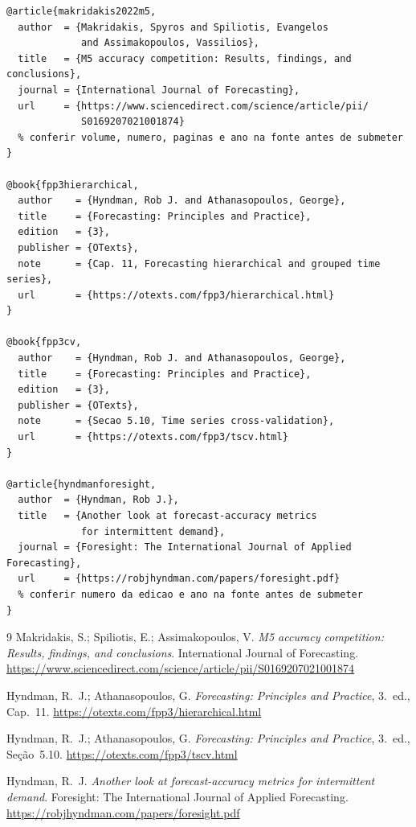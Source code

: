 \documentclass[11pt]{article}
\begin{document}
\begin{verbatim}
@article{makridakis2022m5,
  author  = {Makridakis, Spyros and Spiliotis, Evangelos
             and Assimakopoulos, Vassilios},
  title   = {M5 accuracy competition: Results, findings, and conclusions},
  journal = {International Journal of Forecasting},
  url     = {https://www.sciencedirect.com/science/article/pii/
             S0169207021001874}
  % conferir volume, numero, paginas e ano na fonte antes de submeter
}

@book{fpp3hierarchical,
  author    = {Hyndman, Rob J. and Athanasopoulos, George},
  title     = {Forecasting: Principles and Practice},
  edition   = {3},
  publisher = {OTexts},
  note      = {Cap. 11, Forecasting hierarchical and grouped time series},
  url       = {https://otexts.com/fpp3/hierarchical.html}
}

@book{fpp3cv,
  author    = {Hyndman, Rob J. and Athanasopoulos, George},
  title     = {Forecasting: Principles and Practice},
  edition   = {3},
  publisher = {OTexts},
  note      = {Secao 5.10, Time series cross-validation},
  url       = {https://otexts.com/fpp3/tscv.html}
}

@article{hyndmanforesight,
  author  = {Hyndman, Rob J.},
  title   = {Another look at forecast-accuracy metrics
             for intermittent demand},
  journal = {Foresight: The International Journal of Applied Forecasting},
  url     = {https://robjhyndman.com/papers/foresight.pdf}
  % conferir numero da edicao e ano na fonte antes de submeter
}
\end{verbatim}

\begin{thebibliography}{9}
Makridakis, S.; Spiliotis, E.; Assimakopoulos, V.
\emph{M5 accuracy competition: Results, findings, and conclusions}.
International Journal of Forecasting.
\url{https://www.sciencedirect.com/science/article/pii/S0169207021001874}

Hyndman, R.~J.; Athanasopoulos, G.
\emph{Forecasting: Principles and Practice}, 3.~ed., Cap.~11.
\url{https://otexts.com/fpp3/hierarchical.html}

Hyndman, R.~J.; Athanasopoulos, G.
\emph{Forecasting: Principles and Practice}, 3.~ed., Seção~5.10.
\url{https://otexts.com/fpp3/tscv.html}

Hyndman, R.~J.
\emph{Another look at forecast-accuracy metrics for intermittent demand}.
Foresight: The International Journal of Applied Forecasting.
\url{https://robjhyndman.com/papers/foresight.pdf}
\end{thebibliography}
\end{document}
